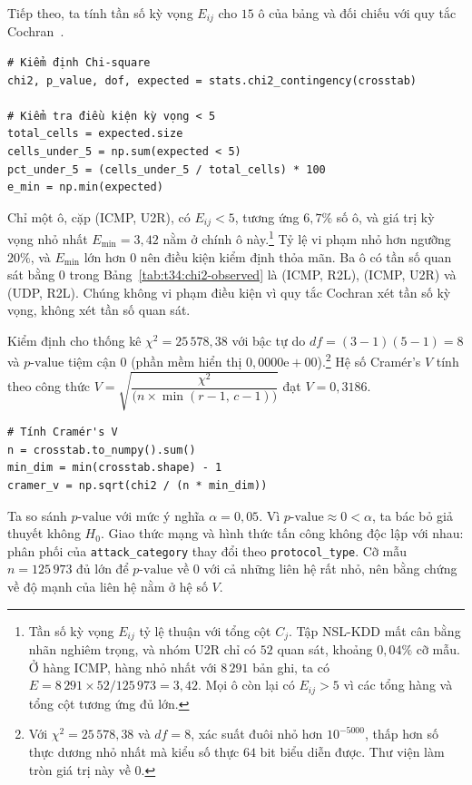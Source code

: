 Tiếp theo, ta tính tần số kỳ vọng $E_{ij}$ cho $15$ ô của bảng và đối chiếu với quy tắc Cochran~\cite{task34_cochran1954}.
\begin{lstlisting}[firstnumber=1]
# Kiểm định Chi-square
chi2, p_value, dof, expected = stats.chi2_contingency(crosstab)

# Kiểm tra điều kiện kỳ vọng < 5
total_cells = expected.size
cells_under_5 = np.sum(expected < 5)
pct_under_5 = (cells_under_5 / total_cells) * 100
e_min = np.min(expected)
\end{lstlisting}
Chỉ một ô, cặp (ICMP, U2R), có $E_{ij} < 5$, tương ứng $6{,}7\%$ số ô, và giá trị kỳ vọng nhỏ nhất $E_{\min} = 3{,}42$ nằm ở chính ô này.\footnote{Tần số kỳ vọng $E_{ij}$ tỷ lệ thuận với tổng cột $C_j$. Tập NSL-KDD mất cân bằng nhãn nghiêm trọng, và nhóm U2R chỉ có $52$ quan sát, khoảng $0{,}04\%$ cỡ mẫu. Ở hàng ICMP, hàng nhỏ nhất với $8\,291$ bản ghi, ta có $E = 8\,291 \times 52 / 125\,973 = 3{,}42$. Mọi ô còn lại có $E_{ij} > 5$ vì các tổng hàng và tổng cột tương ứng đủ lớn.} Tỷ lệ vi phạm nhỏ hơn ngưỡng $20\%$, và $E_{\min}$ lớn hơn $0$ nên điều kiện kiểm định thỏa mãn. Ba ô có tần số quan sát bằng $0$ trong Bảng~\ref{tab:t34:chi2-observed} là (ICMP, R2L), (ICMP, U2R) và (UDP, R2L). Chúng không vi phạm điều kiện vì quy tắc Cochran xét tần số kỳ vọng, không xét tần số quan sát.

Kiểm định cho thống kê $\chi^2 = 25\,578{,}38$ với bậc tự do $df = (3 - 1)(5 - 1) = 8$ và $p\text{-value}$ tiệm cận $0$ (phần mềm hiển thị $0{,}0000\text{e}+00$).\footnote{Với $\chi^2 = 25\,578{,}38$ và $df = 8$, xác suất đuôi nhỏ hơn $10^{-5000}$, thấp hơn số thực dương nhỏ nhất mà kiểu số thực $64$ bit biểu diễn được. Thư viện làm tròn giá trị này về $0$.} Hệ số Cramér's $V$ tính theo công thức $V = \sqrt{\dfrac{\chi^2 }{\bigl(n \times \min(r - 1,\, c - 1)\bigr)}}$ đạt $V = 0{,}3186$.
\begin{lstlisting}[firstnumber=1]
# Tính Cramér's V
n = crosstab.to_numpy().sum()
min_dim = min(crosstab.shape) - 1
cramer_v = np.sqrt(chi2 / (n * min_dim))
\end{lstlisting}

Ta so sánh $p\text{-value}$ với mức ý nghĩa $\alpha = 0{,}05$. Vì $p\text{-value} \approx 0 < \alpha$, ta bác bỏ giả thuyết không $H_0$. Giao thức mạng và hình thức tấn công không độc lập với nhau: phân phối của \texttt{attack\_category} thay đổi theo \texttt{protocol\_type}. Cỡ mẫu $n = 125\,973$ đủ lớn để $p\text{-value}$ về $0$ với cả những liên hệ rất nhỏ, nên bằng chứng về độ mạnh của liên hệ nằm ở hệ số $V$.

